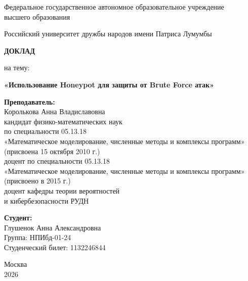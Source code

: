 \begin{titlepage}
\begin{center}

Федеральное государственное автономное образовательное учреждение \\
высшего образования

\vspace{1cm}

Российский университет дружбы народов имени Патриса Лумумбы

\vspace{3cm}

{\Large\bfseries ДОКЛАД}

\vspace{0.5cm}

на тему:

\vspace{0.5cm}

{\large\bfseries «Использование Honeypot для защиты от Brute Force атак»}

\vspace{3cm}

\end{center}

\begin{flushright}
\begin{minipage}{0.55\textwidth}
\textbf{Преподаватель:} \\
Королькова Анна Владиславовна \\
кандидат физико-математических наук \\
по специальности 05.13.18 \\
«Математическое моделирование, численные методы и комплексы программ» \\
(присвоена 15 октября 2010 г.) \\
доцент по специальности 05.13.18 \\
«Математическое моделирование, численные методы и комплексы программ» \\
(присвоено в 2015 г.) \\
доцент кафедры теории вероятностей \\
и кибербезопасности РУДН

\vspace{0.8cm}

\textbf{Студент:} \\
Глушенок Анна Александровна \\
Группа: НПИбд-01-24 \\
Студенческий билет: 1132246844
\end{minipage}
\end{flushright}

\vfill

\begin{center}
Москва \\[0.2cm]
2026
\end{center}

\end{titlepage}

\renewcommand{\figurename}{}
\renewcommand{\tablename}{}

\newpage
